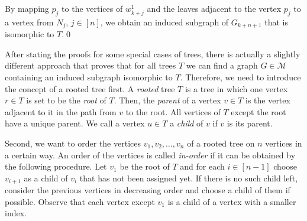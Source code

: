 \begin{prf}
By mapping $p_j$ to the vertices of $w^1_{k+j}$ and the leaves adjacent to the vertex $p_j$ to a vertex from $N_j$, $j\in [n]$, we obtain an induced subgraph of $G_{k+n+1}$ that is isomorphic to $T$.\qed
\end{prf}

After stating the proofs for some special cases of trees, there is actually a slightly different approach that proves that for all trees $T$ we can find a graph $G\in\mathcal{M}$ containing an induced subgraph isomorphic to $T$. Therefore, we need to introduce the concept of a rooted tree first. A \textit{rooted} tree $T$ is a tree in which one vertex $r\in T$ is set to be the \textit{root} of $T$. Then, the \textit{parent} of a vertex $v\in T$ is the vertex adjacent to it in the path from $v$ to the root. All vertices of $T$ except the root have a unique parent. We call a vertex $u\in T$ a \textit{child} of $v$ if $v$ is its parent.

Second, we want to order the vertices $v_1, v_2, \dots , v_n$ of a rooted tree on $n$ vertices in a certain way. An order of the vertices is called \textit{in-order} if it can be obtained by the following procedure. Let $v_1$ be the root of $T$ and for each $i\in [n-1]$ choose $v_{i+1}$ as a child of $v_i$ that has not been assigned yet. If there is no such child left, consider the previous vertices in decreasing order and choose a child of them if possible. Observe that each vertex except $v_1$ is a child of a vertex with a smaller index.

